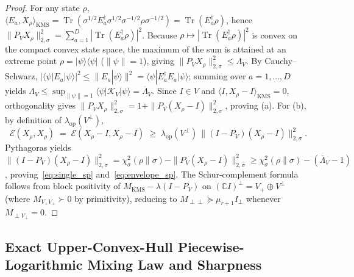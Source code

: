 \documentclass[11pt,a4paper]{article}
\theoremstyle{definition}
\newcommand{\C}{\mathbb{C}}
\newcommand{\Tr}{\operatorname{Tr}}
\newcommand{\Edir}{\mathcal{E}}
\newcommand{\KMS}{\mathrm{KMS}}
\newcommand{\Kchr}{\mathcal{K}}
\begin{document}
\begin{proof}
For any state $\rho$, $\langle E_a, X_\rho \rangle_{\KMS} = \Tr(\sigma^{1/2} E_a^\dagger \sigma^{1/2} \sigma^{-1/2}\rho\sigma^{-1/2}) = \Tr(E_a^\dagger \rho)$, hence $\|P_V X_\rho\|_{2,\sigma}^2 = \sum_{a=1}^D |\Tr(E_a^\dagger \rho)|^2$. Because $\rho \mapsto |\Tr(E_a^\dagger \rho)|^2$ is convex on the compact convex state space, the maximum of the sum is attained at an extreme point $\rho = |\psi\rangle\langle\psi|$ ($\|\psi\| = 1$), giving $\|P_V X_\rho\|_{2,\sigma}^2 \le \Lambda_V$. By Cauchy--Schwarz, $|\langle \psi | E_a | \psi \rangle|^2 \le \|E_a |\psi\rangle\|^2 = \langle \psi | E_a^\dagger E_a | \psi \rangle$; summing over $a = 1, \dots, D$ yields $\Lambda_V \le \sup_{\|\psi\|=1} \langle \psi | \Kchr_V | \psi \rangle = \overline{\Lambda}_V$. Since $I \in V$ and $\langle I, X_\rho - I \rangle_{\KMS} = 0$, orthogonality gives $\|P_V X_\rho\|_{2,\sigma}^2 = 1 + \|P_V(X_\rho - I)\|_{2,\sigma}^2$, proving (a). For (b), by definition of $\lambda_{\mathrm{op}}(V^\perp)$,
\[
  \Edir(X_\rho, X_\rho) \;=\; \Edir(X_\rho - I, X_\rho - I)
  \;\ge\; \lambda_{\mathrm{op}}(V^\perp)\,\|(I - P_V)(X_\rho - I)\|_{2,\sigma}^2.
\]
Pythagoras yields $\|(I - P_V)(X_\rho - I)\|_{2,\sigma}^2 = \chi^2_\sigma(\rho\|\sigma) - \|P_V(X_\rho - I)\|_{2,\sigma}^2 \ge \chi^2_\sigma(\rho\|\sigma) - (\overline{\Lambda}_V - 1)$, proving~\eqref{eq:single_sp} and~\eqref{eq:envelope_sp}. The Schur-complement formula follows from block positivity of $M_{\KMS} - \lambda(I - P_V)$ on $(\C I)^\perp = V_+ \oplus V^\perp$ (where $M_{V_+ V_+} \succ 0$ by primitivity), reducing to $M_{\perp\perp} \succeq \mu_{r+1} I_\perp$ whenever $M_{\perp V_+} = 0$.
\end{proof}

\subsection{Exact Upper-Convex-Hull Piecewise-Logarithmic Mixing Law and Sharpness}
\end{document}
